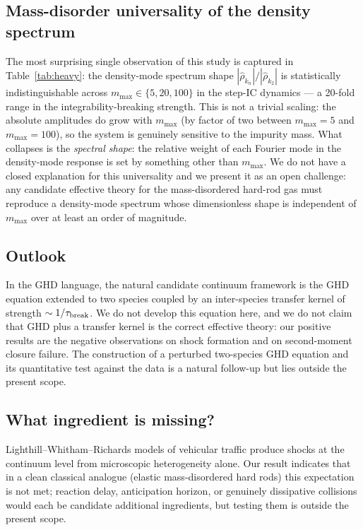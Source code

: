 \documentclass[aps,pre,twocolumn,superscriptaddress,longbibliography,floatfix]{revtex4-2}
\begin{document}
\subsection{Mass-disorder universality of the density spectrum}

The most surprising single observation of this study is
captured in Table~\ref{tab:heavy}: the density-mode spectrum
shape $|\hat\rho_{k_n}|/|\hat\rho_{k_2}|$ is statistically
indistinguishable across $m_{\max}\in\{5,20,100\}$ in the
step-IC dynamics --- a 20-fold range in the
integrability-breaking strength. This is not a trivial scaling:
the absolute amplitudes do grow with $m_{\max}$ (by
factor of two between $m_{\max}=5$ and $m_{\max}=100$),
so the system is genuinely sensitive to the impurity mass. What
collapses is the \emph{spectral shape}: the relative weight of
each Fourier mode in the density-mode response is set by
something other than $m_{\max}$. We do not have a closed
explanation for this universality and we present it as an open
challenge: any candidate effective theory for the
mass-disordered hard-rod gas must reproduce a density-mode
spectrum whose dimensionless shape is independent of $m_{\max}$
over at least an order of magnitude.

\subsection{Outlook}

In the GHD language, the natural candidate continuum framework
is the GHD equation extended to two species coupled by an
inter-species transfer kernel of strength
$\sim 1/\tau_{\rm break}$. We do not develop this equation
here, and we do not claim that GHD plus a transfer kernel is
the correct effective theory: our positive results are
the negative observations on shock formation and on
second-moment closure failure. The construction of a perturbed
two-species GHD equation and its quantitative test against the
data is a natural follow-up but lies outside the present
scope.

\subsection{What ingredient is missing?}

Lighthill--Whitham--Richards models of vehicular traffic
\cite{Lighthill1955} produce shocks at the continuum level
from microscopic heterogeneity alone. Our result indicates
that in a clean classical analogue (elastic mass-disordered
hard rods) this expectation is not met; reaction delay,
anticipation horizon, or genuinely dissipative collisions would
each be candidate additional ingredients, but testing them is
outside the present scope.
\end{document}
